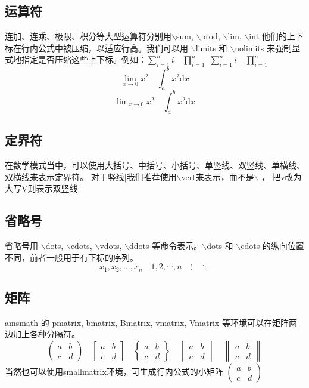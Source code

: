\documentclass{thesis}
\begin{document}
\subsection{运算符}
连加、连乘、极限、积分等大型运算符分别用$\backslash$sum, $\backslash$prod, $\backslash$lim, $\backslash$int
他们的上下标在行内公式中被压缩，以适应行高。我们可以用 $\backslash$limits 和 $\backslash$nolimits
来强制显式地指定是否压缩这些上下标。例如：$ \sum_{i=1}^n i\quad \prod_{i=1}^n $
$ \sum\limits _{i=1}^n i\quad \prod\limits _{i=1}^n $
\[ \lim_{x\to0}x^2 \quad \int_a^b x^2 \mathrm{d}{x} \]
\[ \lim\nolimits _{x\to0}x^2\quad \int\nolimits_a^b x^2 \mathrm{d}{x} \]
\subsection{定界符}
在数学模式当中，可以使用大括号、中括号、小括号、单竖线、双竖线、单横线、双横线来表示定界符。
对于竖线$\vert$我们推荐使用$\backslash$vert来表示，而不是$\backslash \vert$，
把v改为大写V则表示双竖线
\subsection{省略号}
省略号用 $\backslash$dots, $\backslash$cdots, $\backslash$vdots, $\backslash$ddots 
等命令表示。$\backslash$dots 和 $\backslash$cdots 的纵向位置不同，前者一般用于有下标的序列。
\[ x_1,x_2,\dots ,x_n\quad 1,2,\cdots ,n\quad
\vdots\quad \ddots \]
\subsection{矩阵}
amsmath 的 pmatrix, bmatrix, Bmatrix, vmatrix, Vmatrix 
等环境可以在矩阵两边加上各种分隔符。
\begin{equation*}
\begin{pmatrix} a&b\\c&d \end{pmatrix} \quad
\begin{bmatrix} a&b\\c&d \end{bmatrix} \quad
\begin{Bmatrix} a&b\\c&d \end{Bmatrix} \quad
\begin{vmatrix} a&b\\c&d \end{vmatrix} \quad
\begin{Vmatrix} a&b\\c&d \end{Vmatrix}
\end{equation*}
当然也可以使用smallmatrix环境，可生成行内公式的小矩阵
$ ( \begin{smallmatrix} a&b\\c&d \end{smallmatrix} ) $
\end{document}

